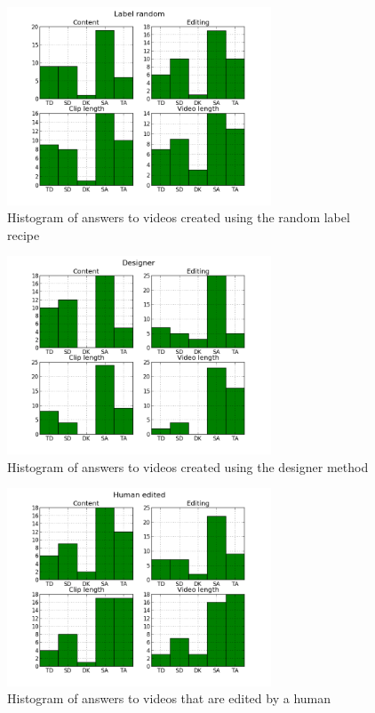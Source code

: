\begin{figure}[!ht]
     \centering
     \includegraphics[width=0.7\textwidth]{img/labelrandom_barplot.png}
     \caption{Histogram of answers to videos created using the random label recipe}\label{fig:hist_labelrandom}
\end{figure}
%
\begin{figure}[!ht]
     \centering
     \includegraphics[width=0.7\textwidth]{img/designer_barplot.png}
     \caption{Histogram of answers to videos created using the designer method}\label{fig:hist_design}
\end{figure}
%
\begin{figure}[!ht]
     \centering
     \includegraphics[width=0.7\textwidth]{img/humanedited_barplot.png}
     \caption{Histogram of answers to videos that are edited by a human}\label{fig:hist_human}
\end{figure}
%
